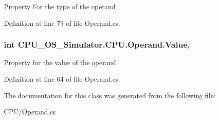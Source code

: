 Property For the type of the operand 



Definition at line 79 of file Operand.\+cs.

\hypertarget{class_c_p_u___o_s___simulator_1_1_c_p_u_1_1_operand_ab109292eba2094db4d7f21cbdbd5bc9e}{}
\subsubsection[{Value}]{\setlength{\rightskip}{0pt plus 5cm}int C\+P\+U\+\_\+\+O\+S\+\_\+\+Simulator.\+C\+P\+U.\+Operand.\+Value\hspace{0.3cm}{\ttfamily [get]}, {\ttfamily [set]}}\label{class_c_p_u___o_s___simulator_1_1_c_p_u_1_1_operand_ab109292eba2094db4d7f21cbdbd5bc9e}


Property for the value of the operand 



Definition at line 64 of file Operand.\+cs.



The documentation for this class was generated from the following file\+:\begin{DoxyCompactItemize}
\item 
C\+P\+U/\hyperlink{_operand_8cs}{Operand.\+cs}\end{DoxyCompactItemize}
